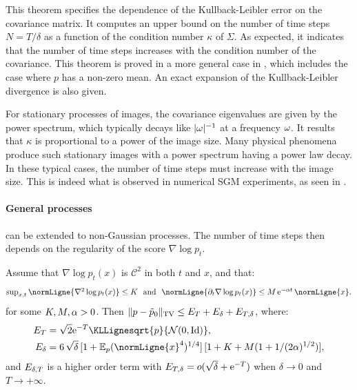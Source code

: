 \documentclass{article}
\begin{document}
This theorem specifies the dependence of the Kullback-Leibler error on the
covariance matrix. It computes an upper bound on the number of time steps
$N = T / \delta$ as a function of the condition number $\kappa$ of $\Sigma$.
As expected, it indicates that the number of time steps increases with the
condition number of the covariance. This theorem is proved in a more general case in , which includes the case where $p$ has a non-zero mean. An exact expansion of the Kullback-Leibler divergence is also given.

For stationary processes of images, the covariance eigenvalues
are given by the power spectrum, which typically decays like $|{\omega}|^{-1}$ at a
frequency ${\omega}$. It results that $\kappa$ is proportional to a power of the
image size. Many physical phenomena produce such stationary images with a
power spectrum having a power law decay. In these typical cases, the number of time steps
must increase with the image size. This is indeed what is observed in
numerical SGM experiments, as seen in .

\paragraph{General processes}  can be
extended to non-Gaussian processes.  The
number of time steps then depends on the regularity of the score $\nabla \log p_t$.

\begin{theorem}
  \label{thm:control_diffusion}
  Assume that $\nabla \log p_t (x)$ is $\mathscr{C}^2$ in both $t$ and $x$, and that:
  \begin{equation}\label{params:thm2}
    \textstyle{
  \sup_{x,t} \normLigne{\nabla^2 \log p_t(x)} \leq
  \Ktt}~~\mbox{and}~~
  \textstyle{\normLigne{\partial_t \nabla \log p_t(x)} \leq \Mtt\, \rme^{-\alpha t}\,
  \normLigne{x}}.
  \end{equation}
  for some $K, M , \alpha >0$. Then $\| p - \tilde p_0 \|_{\mathrm{TV}} \leq {E}_T + {E}_\delta + {E}_{T, \delta}$, where:
  \begin{align}
  \label{firsteq}
    \error_T &= \sqrt{2} \rme^{-T} \KLLignesqrt{p}{{\mathcal{N}(0, \Id)}}  ,\\
     \label{secondeq}
    \error_\delta &= 6\,\sqrt{\delta}\, [1+{\mathbb E}_p (\normLigne{x}^4 )^{1/4}]\, [1 +  \Ktt + \Mtt (1 +1/(2 \alpha)^{1/2}) ]  ,
  \end{align}
  and ${E}_{\delta, T}$ is a higher order term with $E_{T, \delta} = o(\sqrt{\delta} + \mathrm{e}^{-T})$ when $\delta \to 0$ and $T \to +\infty$.
\end{theorem}
\end{document}
